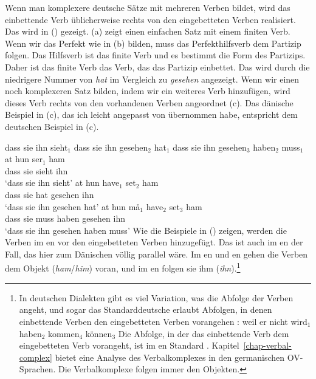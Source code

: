 Wenn man komplexere deutsche Sätze mit mehreren Verben bildet, wird das einbettende Verb üblicherweise
rechts von den eingebetteten Verben realisiert.
Das wird in () gezeigt. (a) zeigt einen einfachen
Satz mit einem finiten Verb. Wenn wir das Perfekt wie in (b) bilden, muss das Perfekthilfsverb
dem Partizip folgen. Das Hilfsverb ist das finite Verb und es bestimmt die Form des
Partizips. Daher ist das finite Verb das Verb, das das Partizip einbettet. Das wird durch die
niedrigere Nummer von \emph{hat} im Vergleich zu \emph{gesehen} angezeigt. Wenn wir einen noch komplexeren
Satz bilden, indem wir ein weiteres Verb hinzufügen, wird dieses Verb rechts von den vorhandenen Verben angeordnet
(c).  Das dänische Beispiel in (c), das ich leicht angepasst von \citet[]{Oersnes2009b} übernommen habe, entspricht dem deutschen Beispiel in (c).

\eal
\ex
dass sie ihn sieht$_1$\german
\ex
dass sie ihn gesehen$_2$ hat$_1$
\ex
dass sie ihn gesehen$_3$ haben$_2$ muss$_1$
\zl
\eal
\label{ex-Danish-embedding}
\ex
\gll at   hun ser$_1$ ham\\
     dass sie  sieht    ihn\\
\glt `dass sie ihn sieht'
\ex
\gll at   hun have$_1$ set$_2$ ham\\
     dass sie  hat      gesehen ihn\\
\glt `dass sie ihn gesehen hat'
\ex
\gll at   hun må$_1$ have$_2$ set$_3$ ham\\
     dass sie  muss   haben    gesehen ihn\\
\glt `dass sie ihn gesehen haben muss'
\zl
%
Wie die Beispiele in () zeigen, werden die Verben im en vor den eingebetteten
Verben hinzugefügt. Das ist auch im en der Fall, das hier zum Dänischen völlig
parallel wäre. Im en und en gehen die
Verben dem Objekt (\emph{ham}/\emph{him}) voran, und im en folgen sie ihm
(\emph{ihn}).\footnote{
In deutschen Dialekten gibt es viel Variation, was die Abfolge der Verben angeht, und sogar
das Standarddeutsche erlaubt Abfolgen, in denen einbettende Verben den eingebetteten Verben vorangehen \parencites[--64]{Bech55a}[]{dBE83a}:
\ea
weil er nicht wird$_1$ haben$_2$ kommen$_4$ können$_3$
\z
Die Abfolge, in der das einbettende Verb dem eingebetteten Verb vorangeht, ist im en Standard \citep[]{dBE83a}. Kapitel~\ref{chap-verbal-complex}
bietet eine Analyse des Verbalkomplexes in den germanischen OV-Sprachen. Die Verbalkomplexe folgen immer den Objekten.
}

